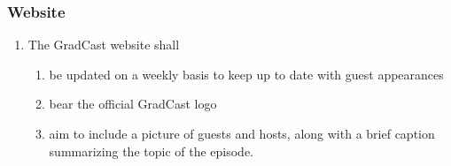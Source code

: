 \subsubsection{Website}	
\begin{enumerate} [label*=\arabic*., align=left]
\item The GradCast website shall
\begin{enumerate} [label*=\arabic*., align=left]	
\item be updated on a weekly basis to keep up to date with guest appearances
\item bear the official GradCast logo
\item aim to include a picture of guests and hosts, along with a brief caption summarizing the topic of the episode.
\end{enumerate}
\end{enumerate}